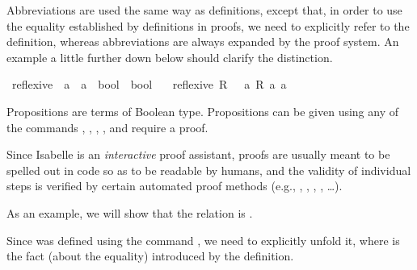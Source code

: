 \begin{isabellebody}
\begin{isamarkuptext}%
Abbreviations are used the same way as definitions, except that, in order to use the equality established by definitions in proofs, we need to explicitly refer to the definition, whereas abbreviations are always expanded by the proof system. An example a little further down below should clarify the distinction.%
\end{isamarkuptext}\isamarkuptrue%
\isamarkupfalse%
\ reflexive\ {\isacharcolon}{\kern0pt}{\isacharcolon}{\kern0pt}\ {\isacartoucheopen}{\isacharparenleft}{\kern0pt}{\isacharprime}{\kern0pt}a\ {\isasymRightarrow}\ {\isacharprime}{\kern0pt}a\ {\isasymRightarrow}\ bool{\isacharparenright}{\kern0pt}\ {\isasymRightarrow}\ bool{\isacartoucheclose}\isanewline
\ \ \ {\isacartoucheopen}reflexive\ R\ {\isasymequiv}\ {\isasymforall}\ a{\isachardot}{\kern0pt}\ R\ a\ a{\isacartoucheclose}%
\isadelimdocument
%
\endisadelimdocument
%
\isatagdocument
%
\isamarkuptrue%
%
\endisatagdocument
{\isafolddocument}%
%
\isadelimdocument
%
\endisadelimdocument
%
\begin{isamarkuptext}%
Propositions are terms of Boolean type. Propositions can be given using any of the commands , , , , and require a proof.

Since Isabelle is an \emph{interactive} proof assistant, proofs are usually meant to be spelled out in code so as to be readable by humans, and the validity of individual steps is verified by certain automated proof methods (e.g.\@ {}, , , , , \dots). 

As an example, we will show that the relation  is .

Since  was defined using the command , we need to explicitly unfold it, where  is the fact (about the equality) introduced by the definition.


\end{isamarkuptext}
\end{isabellebody}
